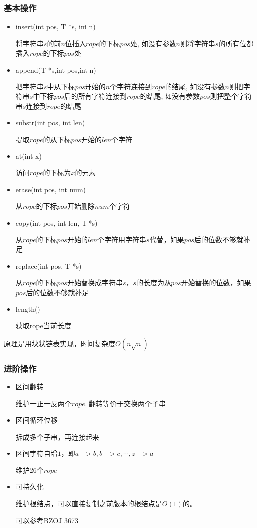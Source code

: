 \subsubsection{基本操作}
\begin{itemize}
\item insert(int pos, T *s, int n)\par
将字符串$s$的前$n$位插入$rope$的下标$pos$处, 如没有参数$n$则将字符串$s$的所有位都插入$rope$的下标$pos$处
\item append(T *s,int pos,int n) \par
把字符串$s$中从下标$pos$开始的$n$个字符连接到$rope$的结尾, 如没有参数$n$则把字符串$s$中下标$pos$后的所有字符连接到$rope$的结尾, 如没有参数$pos$则把整个字符串$s$连接到$rope$的结尾
\item substr(int pos, int len) \par
提取$rope$的从下标$pos$开始的$len$个字符
\item at(int x) \par
访问$rope$的下标为$x$的元素
\item erase(int pos, int num) \par
从$rope$的下标$pos$开始删除$num$个字符
\item copy(int pos, int len, T *s) \par
从$rope$的下标$pos$开始的$len$个字符用字符串$s$代替，如果$pos$后的位数不够就补足
\item replace(int pos, T *s)\par
从$rope$的下标$pos$开始替换成字符串$s$，$s$的长度为从$pos$开始替换的位数，如果$pos$后的位数不够就补足
\item length()\par
获取rope当前长度
\end{itemize}
原理是用块状链表实现，时间复杂度$O(n\sqrt{n})$


\subsubsection{进阶操作}
\begin{itemize}
\item 区间翻转\par
维护一正一反两个$rope$, 翻转等价于交换两个子串
\item 区间循环位移\par
拆成多个子串，再连接起来
\item 区间字符自增$1$，即$a->b, b->c, \cdots, z->a$\par
维护$26$个$rope$
\item 可持久化\par
维护根结点，可以直接复制之前版本的根结点是$O(1)$的。\par
可以参考BZOJ 3673\par
\end{itemize}


